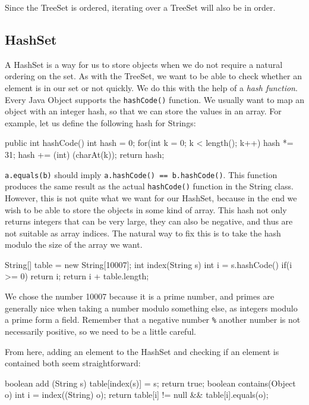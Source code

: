 \documentclass[11pt]{book}
\begin{document}
Since the TreeSet is ordered, iterating over a TreeSet will also be in order.

\subsection{HashSet}

A HashSet is a way for us to store objects when we do not require a natural ordering on the set. As with the TreeSet, we want to be able to check whether an element is in our set or not quickly. We do this with the help of a \textit{hash function}. Every Java Object supports the \texttt{hashCode()} function. We usually want to map an object with an integer hash, so that we can store the values in an array. For example, let us define the following hash for Strings:

\begin{mylstlisting}
public int hashCode() {
	int hash = 0;
    for(int k = 0; k < length(); k++) {
		hash *= 31;
        hash += (int) (charAt(k));
    }
    return hash;
}
\end{mylstlisting}

\texttt{a.equals(b)} should imply \texttt{a.hashCode() == b.hashCode()}. This function produces the same result as the actual \texttt{hashCode()} function in the String class. However, this is not quite what we want for our HashSet, because in the end we wish to be able to store the objects in some kind of array. This hash not only returns integers that can be very large, they can also be negative, and thus are not suitable as array indices. The natural way to fix this is to take the hash modulo the size of the array we want.

\begin{mylstlisting}
String[] table = new String[10007];
int index(String s) {
	int i = s.hashCode() %
    if(i >= 0)
    	return i;
	return i + table.length;
}
\end{mylstlisting}

We chose the number 10007 because it is a prime number, and primes are generally nice when taking a number modulo something else, as integers modulo a prime form a field. Remember that a negative number \texttt{\%} another number is not necessarily positive, so we need to be a little careful.

From here, adding an element to the HashSet and checking if an element is contained both seem straightforward:

\begin{mylstlisting}
boolean add (String s) {
	table[index(s)] = s;
    return true;
}
boolean contains(Object o) {
    int i = index((String) o);
	return table[i] != null && table[i].equals(o);
}
\end{mylstlisting}
\end{document}
